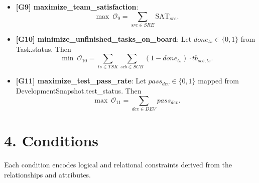 \documentclass[11pt]{article}
\begin{document}
\begin{itemize}[leftmargin=*,itemsep=6pt]
  \item \textbf{[G9] maximize\_team\_satisfaction}:
  \[
  \max \ \mathcal{O}_9=\sum_{sre\in SRE} \text{SAT}_{sre}.
  \]

  \item \textbf{[G10] minimize\_unfinished\_tasks\_on\_board}:
  Let $done_{ts}\in\{0,1\}$ from Task.status. Then
  \[
  \min \ \mathcal{O}_{10}=\sum_{ts\in TSK}\sum_{scb\in SCB} (1-done_{ts})\cdot tb_{scb,ts}.
  \]

  \item \textbf{[G11] maximize\_test\_pass\_rate}:
  Let $pass_{dev}\in\{0,1\}$ mapped from DevelopmentSnapshot.test\_status. Then
  \[
  \max \ \mathcal{O}_{11}=\sum_{dev\in DEV} pass_{dev}.
  \]
\end{itemize}

\section{4. Conditions}
Each condition encodes logical and relational constraints derived from the relationships and attributes.
\end{document}
